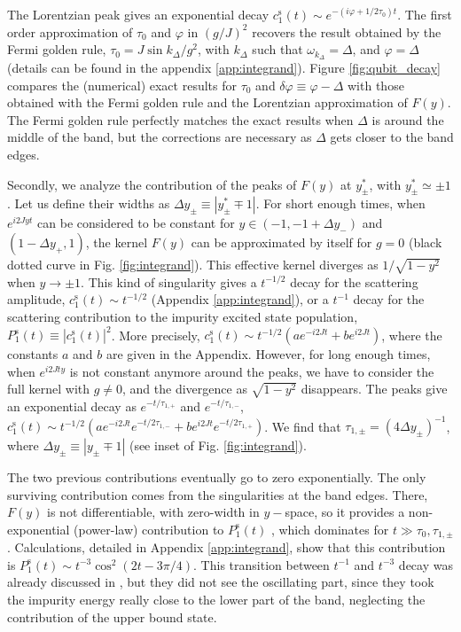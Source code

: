 \documentclass[aps,pra,twocolumn,floatfix,superscriptaddress]{revtex4-1}%
\begin{document}
The Lorentzian peak gives an exponential decay $c_1^\text{s}(t)\sim e^{-(i\varphi+1/2\tau_0)t}$. 
The first order approximation of $\tau_0$ and $\varphi$ in $(g/J)^2$ recovers the result obtained by the Fermi golden rule, $\tau_0=J\sin k_\Delta/g^2$, with $k_\Delta$ such that $\omega_{k_\Delta}=\Delta$, and $\varphi=\Delta$ (details can be found in the appendix \ref{app:integrand}). 
Figure \ref{fig:qubit_decay} compares the (numerical) exact results for $\tau_0$ and $\delta\varphi\equiv\varphi-\Delta$ with those obtained with the Fermi golden rule and the Lorentzian approximation of $F(y)$. The Fermi golden rule perfectly matches the exact results when $\Delta$ is around the middle of the band, but {\color{blue}the corrections are} necessary as $\Delta$ gets closer to the band edges. %

Secondly, we analyze the contribution of the peaks of $F(y)$ at $y_\pm^*$, with $y_\pm^*\simeq \pm 1$. Let us define their widths as $\Delta y_\pm\equiv |y_\pm^* \mp 1|$. For short enough times, when $e^{i2Jyt}$ can be considered to be constant for $y\in (-1,-1+\Delta y_-)$ and $(1-\Delta y_+,1)$, the kernel $F(y)$ can be approximated by itself for $g=0$ (black dotted curve in Fig. \ref{fig:integrand}). This effective kernel diverges as $1/\sqrt{1-y^2}$ when $y\to\pm 1$. This kind of singularity gives a $t^{-1/2}$ decay for the scattering amplitude, $c_1^\text{s}(t)\sim t^{-1/2}$ (Appendix \ref{app:integrand}), or a $t^{-1}$ decay for the scattering contribution to the impurity excited state population, $P_1^\text{s}(t)\equiv |c_1^\text{s}(t)|^2$. More precisely, $c_1^\text{s}(t)\sim t^{-1/2}(a e^{-i2Jt} + b e^{i2Jt})$, where the constants $a$ and $b$ are given in the Appendix. However, for long enough times, when $e^{i2Jty}$ is not constant anymore around the peaks, we have to consider the full kernel with $g\neq 0$, and the divergence as $\sqrt{1-y^2}$ disappears. The peaks give an exponential decay as $e^{-t/\tau_{1,+}}$ and $e^{-t/\tau_{1,-}}$, $c_1^\text{s}(t)\sim t^{-1/2}(a e^{-i2Jt}e^{-t/2\tau_{1,-}} + b e^{i2Jt}e^{-t/2\tau_{1,+}})$. We find that $\tau_{1,\pm} = (4 \Delta y_\pm)^{-1}$, where $\Delta y_\pm\equiv |y_\pm \mp 1|$ (see inset of Fig. \ref{fig:integrand}).

The two previous contributions eventually go to zero exponentially. The only surviving contribution comes from the singularities at the band edges. There, $F(y)$ is not differentiable, with zero-width in $y-$space, so it provides a non-exponential (power-law) contribution to  $P_1^\text{s}(t) $ \cite{Khalfin1958,Fonda1978,Hack1982,Gaveau1995}, which dominates for  $t\gg \tau_0,\tau_{1,\pm}$. Calculations, detailed in Appendix \ref{app:integrand}, show that this contribution is $P_1^\text{s}(t) \sim t ^{-3} \cos^2(2t-3\pi/4)$. This transition between $t^{-1}$ and $t^{-3}$ decay was already discussed in \cite{Garmon2013}, but they did not see the oscillating part, since they took the impurity energy really close to the lower part of the band, neglecting the contribution of the upper bound state.
\end{document}
